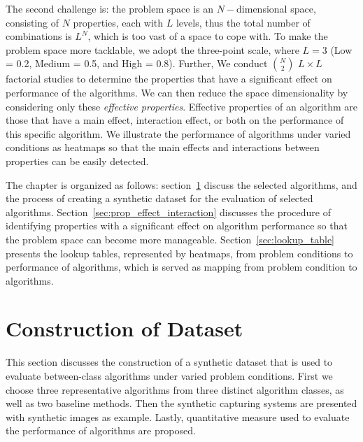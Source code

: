 The second challenge is: the problem space is an $N-$dimensional space, consisting of $N$ properties, each with $L$ levels, thus the total number of combinations is $L^N$, which is too vast of a space to cope with. To make the problem space more tacklable, we adopt the three-point scale, where $L=3$ (Low = 0.2, Medium = 0.5, and High = 0.8). Further, We conduct $\binom{N}{2}$ $L\times L$ factorial studies to determine the properties that have a significant effect on performance of the algorithms. We can then reduce the space dimensionality by considering only these \textit{effective properties}. Effective properties of an algorithm are those that have a main effect, interaction effect, or both on the performance of this specific algorithm. We illustrate the performance of algorithms under varied conditions as heatmaps so that the main effects and interactions between properties can be easily detected.

The chapter is organized as follows: section~\ref{sec:create_synth_dataset} discuss the selected algorithms, and the process of creating a synthetic dataset for the evaluation of selected algorithms. Section~\ref{sec:prop_effect_interaction} discusses the procedure of identifying properties with a significant effect on algorithm performance so that the problem space can become more manageable. Section~\ref{sec:lookup_table} presents the lookup tables, represented by heatmaps, from problem conditions to performance of algorithms, which is served as mapping from problem condition to algorithms.

\section{Construction of Dataset}
\label{sec:create_synth_dataset}
This section discusses the construction of a synthetic dataset that is used to evaluate between-class algorithms under varied problem conditions. First we choose three representative algorithms from three distinct algorithm classes, as well as two baseline methods. Then the synthetic capturing systems are presented with synthetic images as example. Lastly, quantitative measure used to evaluate the performance of algorithms are proposed.


